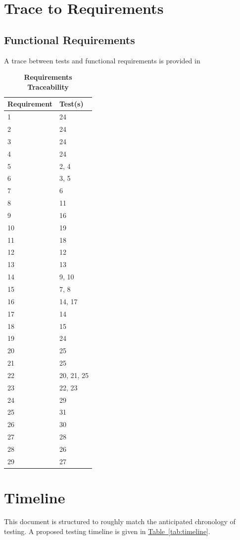 \documentclass[12pt, titlepage]{article}
\begin{document}
\newpage
\section{Trace to Requirements}
\label{sec:reqtesting}



\subsection{Functional Requirements}
A trace between tests and functional requirements is provided in

\begin{table}[h]
\caption{\bf Requirements Traceability} \label{tab:reqtrace}
\centering
\begin{tabularx}{0.55\textwidth}{p{4cm}X}
\toprule {\bf Requirement} & {\bf Test(s)}\\
\midrule
1	&	24	\\
2	&	24	\\
3	&	24	\\
4	&	24	\\
5	&	2, 4	\\
6	&	3, 5	\\
7	&	6	\\
8	&	11	\\
9	&	16\\
10	&	19	\\
11	&	18	\\
12	&	12	\\
13	&	13	\\
14	&	9, 10	\\
15	&	7, 8	\\
16	&	14, 17	\\
17	&	14	\\
18	&	15	\\
19	&	24	\\
20	&	25	\\
21	&	25	\\
22	&	20, 21, 25	\\
23	&	22, 23	\\
24	&	29	\\
25	&	31	\\
26	&	30	\\
27	&	28	\\
28  &    26   \\
29  &    27   \\
\bottomrule
\end{tabularx}
\end{table}


\newpage
\section{Timeline}
\label{sec:timeline}
This document is structured to roughly match the anticipated chronology of testing.  A proposed testing timeline is given in \hyperref[tab:timeline]{Table~\ref*{tab:timeline}}.
\end{document}
